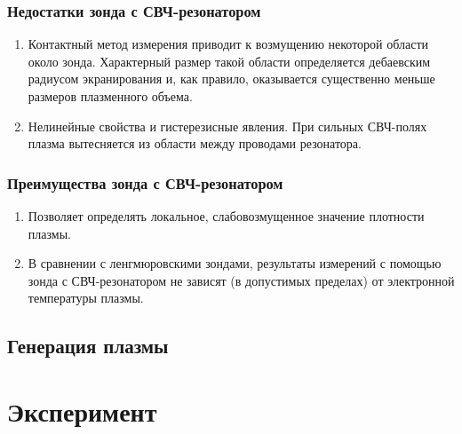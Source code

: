 \documentclass[10pt,pdf,hyperref={unicode}, dvipsnames]{beamer}
\begin{document}
\begin{frame}
	\frametitle{Недостатки зонда с СВЧ-резонатором}
	\begin{enumerate}
		\item Контактный метод измерения приводит к возмущению некоторой области около зонда. Характерный размер такой области определяется дебаевским радиусом экранирования и, как правило, оказывается существенно меньше размеров плазменного объема.
		\item Нелинейные свойства и гистерезисные явления. При сильных СВЧ-полях плазма вытесняется из области между проводами резонатора.
	\end{enumerate}
\end{frame}

\begin{frame}
	\frametitle{Преимущества зонда с СВЧ-резонатором}
	\begin{enumerate}
		\item Позволяет определять локальное, слабовозмущенное значение плотности плазмы. 
		\item В сравнении с ленгмюровскими зондами, результаты измерений с помощью зонда с СВЧ-резонатором не зависят (в допустимых пределах) от электронной температуры плазмы. %

	\end{enumerate}
\end{frame}
    


\subsection{Генерация плазмы}
\section{Эксперимент}
\end{document}

